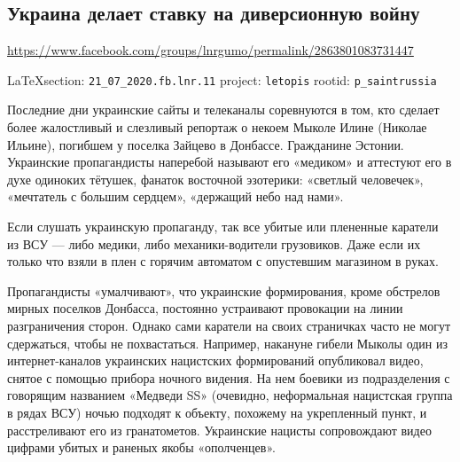  
 

\subsection{Украина делает ставку на диверсионную войну}
\label{sec:21_07_2020.fb.lnr.11}
\url{https://www.facebook.com/groups/lnrgumo/permalink/2863801083731447}
  
\vspace{0.5cm}
{\small\LaTeX section: \verb|21_07_2020.fb.lnr.11| project: \verb|letopis| rootid: \verb|p_saintrussia|}
\vspace{0.5cm}



Последние дни украинские сайты и телеканалы соревнуются в том, кто сделает
более жалостливый и слезливый репортаж о некоем Мыколе Илине (Николае Ильине),
погибшем у поселка Зайцево в Донбассе. Гражданине Эстонии. Украинские
пропагандисты наперебой называют его «медиком» и аттестуют его в духе одиноких
тётушек, фанаток восточной эзотерики: «светлый человечек», «мечтатель с большим
сердцем», «держащий небо над нами».

Если слушать украинскую пропаганду, так все убитые или плененные каратели из
ВСУ --- либо медики, либо механики-водители грузовиков. Даже если их только что
взяли в плен с горячим автоматом с опустевшим магазином в руках.

Пропагандисты «умалчивают», что украинские формирования, кроме обстрелов мирных
поселков Донбасса, постоянно устраивают провокации на линии разграничения
сторон. Однако сами каратели на своих страничках часто не могут сдержаться,
чтобы не похвастаться. Например, накануне гибели Мыколы один из
интернет-каналов украинских нацистских формирований опубликовал видео, снятое с
помощью прибора ночного видения. На нем боевики из подразделения с говорящим
названием «Медведи SS» (очевидно, неформальная нацистская группа в рядах ВСУ)
ночью подходят к объекту, похожему на укрепленный пункт, и расстреливают его из
гранатометов. Украинские нацисты сопровождают видео цифрами убитых и раненых
якобы «ополченцев».

